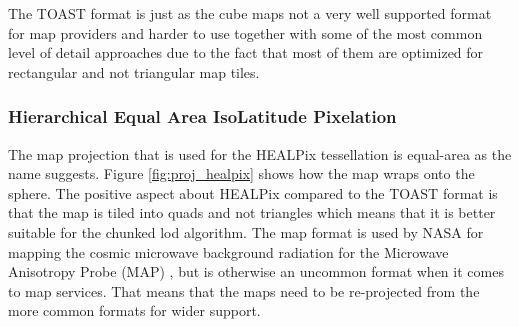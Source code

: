 The TOAST format is just as the cube maps not a very well supported format for map providers and harder to use together with some of the most common level of detail approaches due to the fact that most of them are optimized for rectangular and not triangular map tiles.

\subsubsection{Hierarchical Equal Area IsoLatitude Pixelation}

The map projection that is used for the HEALPix tessellation is equal-area as the name suggests. Figure \ref{fig:proj_healpix} shows how the map wraps onto the sphere. The positive aspect about HEALPix compared to the TOAST format is that the map is tiled into quads and not triangles which means that it is better suitable for the chunked lod \cite{cozzi11} algorithm. The map format is used by NASA for mapping the cosmic microwave background radiation for the Microwave Anisotropy Probe (MAP) \cite{healpix}, but is otherwise an uncommon format when it comes to map services. That means that the maps need to be re-projected from the more common formats for wider support.

